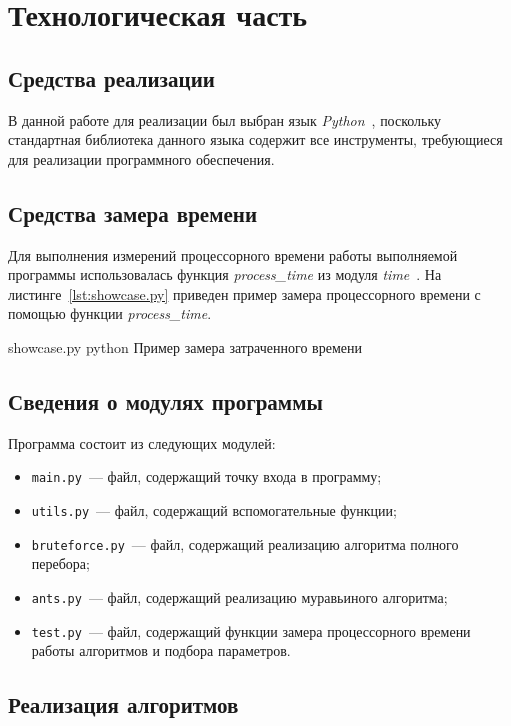 \chapter{Технологическая часть}

\section{Средства реализации}

В данной работе для реализации был выбран язык \textit{Python}~\cite{python-lang}, поскольку стандартная библиотека данного языка содержит все инструменты, требующиеся для реализации программного обеспечения.

\section{Средства замера времени}

Для выполнения измерений процессорного времени работы выполняемой программы использовалась функция \textit{process\_time} из модуля \textit{time}~\cite{python-lang-time}.
На листинге~\ref{lst:showcase.py} приведен пример замера процессорного времени с помощью функции \textit{process\_time}.

	{showcase.py}
	{python}
	{Пример замера затраченного времени}

\section{Сведения о модулях программы}

Программа состоит из следующих модулей:
\begin{itemize}
	\item \texttt{main.py}~--- файл, содержащий точку входа в программу;
	\item \texttt{utils.py}~--- файл, содержащий вспомогательные функции;
	\item \texttt{bruteforce.py}~--- файл, содержащий реализацию алгоритма полного перебора;
	\item \texttt{ants.py}~--- файл, содержащий реализацию муравьиного алгоритма;
	\item \texttt{test.py}~--- файл, содержащий функции замера процессорного времени работы алгоритмов и подбора параметров.
\end{itemize}

\section{Реализация алгоритмов}

